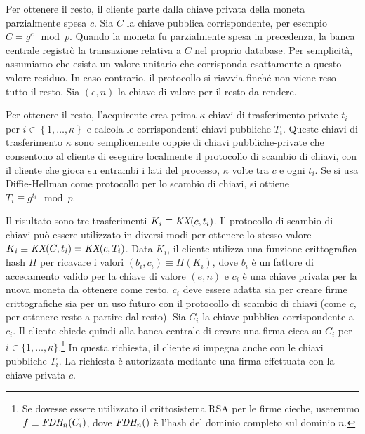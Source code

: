 \documentclass{article}
\begin{document}
Per ottenere il resto, il cliente parte dalla chiave privata della 
moneta parzialmente spesa $c$. Sia $C$ la chiave pubblica corrispondente, 
per esempio  
$C = g^{c} \mod p$. 
Quando la moneta fu parzialmente spesa in precedenza, la banca centrale 
registrò la transazione relativa a $C$ nel proprio database. Per 
semplicità, assumiamo che esista un valore unitario che corrisponda 
esattamente a questo valore residuo. In caso contrario, il protocollo si 
riavvia finché non viene reso tutto il resto. Sia $(e,n)$ la 
chiave di valore per il resto da rendere.

Per ottenere il resto, l'acquirente crea prima $\kappa$ chiavi di 
trasferimento private $t_{i}$ per 
$i \in \left\{ 1,\ldots,\kappa \right\}$ e calcola le 
corrispondenti chiavi pubbliche $T_{i}$. Queste chiavi di 
trasferimento $\kappa$ sono semplicemente coppie di chiavi 
pubbliche-private che consentono al cliente di eseguire localmente il 
protocollo di scambio di chiavi, con il cliente che gioca su entrambi 
i lati del processo, $\kappa$ volte tra $c$ e ogni $t_{i}$. 
Se si usa Diffie-Hellman come protocollo per lo scambio di chiavi, si 
ottiene 
$T_{i} \equiv g^{t_{i}} \mod p$.

Il risultato sono tre trasferimenti 
$K_{i} \equiv \emph{KX}(c,t_{i})$. Il protocollo di scambio di chiavi 
può essere utilizzato in diversi modi per ottenere lo stesso valore 
$K_{i} \equiv \emph{KX}(C,t_{i}) = \emph{KX}(c,T_{i})$. 
Data $K_{i}$, il cliente utilizza una funzione crittografica hash $H$ 
per ricavare i valori 
$(b_{i},c_{i}) \equiv H(K_{i})$, dove 
$b_{i}$ è un fattore di accecamento valido per la chiave di valore 
$(e,n)$ e $c_{i}$ 
è una chiave privata per la nuova moneta da ottenere come resto. 
$c_{i}$ deve essere adatta sia per creare firme crittografiche sia per 
un uso futuro con il protocollo di scambio di chiavi 
(come $c$, per ottenere resto a partire dal resto). 
Sia $C_{i}$ la chiave pubblica corrispondente a $c_{i}$. 
Il cliente chiede quindi alla banca centrale di creare una firma cieca su 
$C_{i}$ per $i \in \{ 1,\ldots,\kappa\}$.\footnote{Se dovesse essere 
utilizzato il crittosistema RSA per le firme cieche, useremmo 
$f \equiv \emph{FDH}_{n}(C_{i})$, dove 
$\emph{FDH}_{n}()$ 
è l'hash del dominio completo sul dominio $n$.} In questa richiesta, il 
cliente si impegna anche con le chiavi pubbliche 
$T_{i}$. 
La richiesta è autorizzata mediante una firma effettuata con la chiave 
privata $c$.
\end{document}
